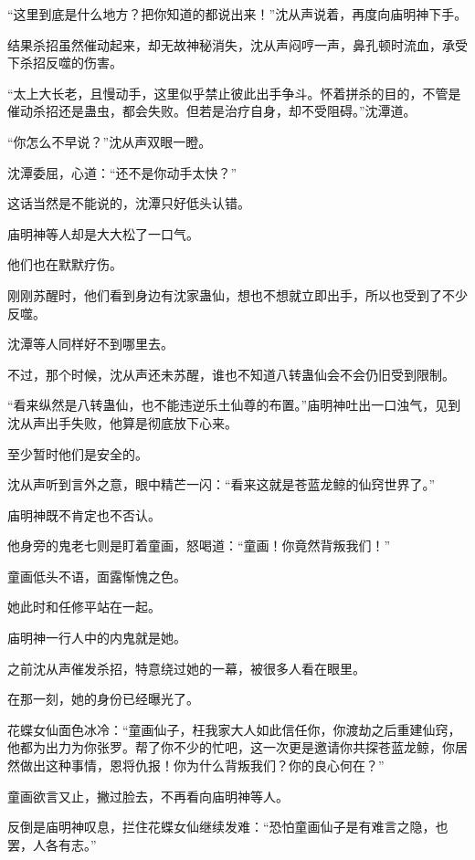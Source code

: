 
\begin{this_body}

“这里到底是什么地方？把你知道的都说出来！”沈从声说着，再度向庙明神下手。

结果杀招虽然催动起来，却无故神秘消失，沈从声闷哼一声，鼻孔顿时流血，承受下杀招反噬的伤害。

“太上大长老，且慢动手，这里似乎禁止彼此出手争斗。怀着拼杀的目的，不管是催动杀招还是蛊虫，都会失败。但若是治疗自身，却不受阻碍。”沈潭道。

“你怎么不早说？”沈从声双眼一瞪。

沈潭委屈，心道：“还不是你动手太快？”

这话当然是不能说的，沈潭只好低头认错。

庙明神等人却是大大松了一口气。

他们也在默默疗伤。

刚刚苏醒时，他们看到身边有沈家蛊仙，想也不想就立即出手，所以也受到了不少反噬。

沈潭等人同样好不到哪里去。

不过，那个时候，沈从声还未苏醒，谁也不知道八转蛊仙会不会仍旧受到限制。

“看来纵然是八转蛊仙，也不能违逆乐土仙尊的布置。”庙明神吐出一口浊气，见到沈从声出手失败，他算是彻底放下心来。

至少暂时他们是安全的。

沈从声听到言外之意，眼中精芒一闪：“看来这就是苍蓝龙鲸的仙窍世界了。”

庙明神既不肯定也不否认。

他身旁的鬼老七则是盯着童画，怒喝道：“童画！你竟然背叛我们！”

童画低头不语，面露惭愧之色。

她此时和任修平站在一起。

庙明神一行人中的内鬼就是她。

之前沈从声催发杀招，特意绕过她的一幕，被很多人看在眼里。

在那一刻，她的身份已经曝光了。

花蝶女仙面色冰冷：“童画仙子，枉我家大人如此信任你，你渡劫之后重建仙窍，他都为出力为你张罗。帮了你不少的忙吧，这一次更是邀请你共探苍蓝龙鲸，你居然做出这种事情，恩将仇报！你为什么背叛我们？你的良心何在？”

童画欲言又止，撇过脸去，不再看向庙明神等人。

反倒是庙明神叹息，拦住花蝶女仙继续发难：“恐怕童画仙子是有难言之隐，也罢，人各有志。”


\end{this_body}

